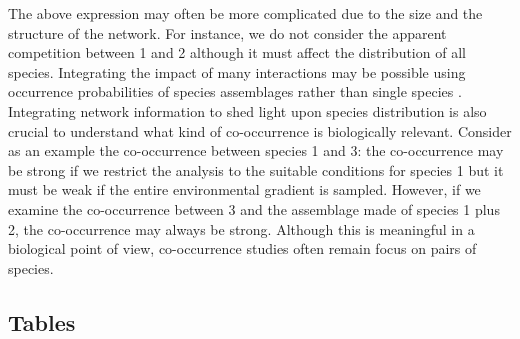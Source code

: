 The above expression may often be more complicated due to the size and
the structure of the network. For instance, we do not consider the
apparent competition between 1 and 2 although it must affect the
distribution of all species. Integrating the impact of many interactions
may be possible using occurrence probabilities of species assemblages
rather than single species \citep{Cazelles2015b}. Integrating network
information to shed light upon species distribution is also crucial to
understand what kind of co-occurrence is biologically relevant. Consider
as an example the co-occurrence between species 1 and 3: the
co-occurrence may be strong if we restrict the analysis to the suitable
conditions for species 1 but it must be weak if the entire environmental
gradient is sampled. However, if we examine the co-occurrence between 3
and the assemblage made of species 1 plus 2, the co-occurrence may
always be strong. Although this is meaningful in a biological point of
view, co-occurrence studies often remain focus on pairs of species.

\newpage

\subsection{Tables}\label{tables}

